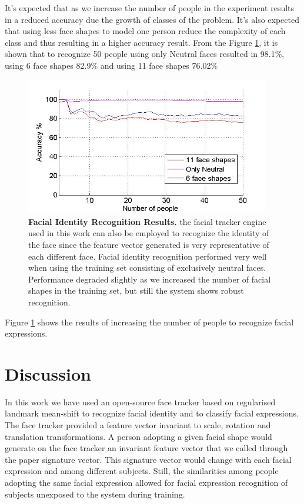 \documentclass[]{article}
\begin{document}
It's expected that as we increase the number of people in the experiment results
in a reduced accuracy due the growth of classes of the problem. It’s also
expected  that using less face shapes to model one person reduce the complexity
of  each class and thus resulting in a higher accuracy result.
From the Figure \ref{feRecognition}, it is shown that to recognize 50 people
using only Neutral faces resulted in 98.1\%, using 6 face shapes 82.9\% and
using 11 face shapes 76.02\%
 


\begin{figure}[ht]
\begin{center}
\vspace{-3mm}
\includegraphics[width=0.95\textwidth]{figures/peopleRecognition4.jpg}
\end{center}
\caption{\textbf{Facial Identity Recognition Results.} the facial tracker engine used in this work can also be employed 
to recognize the identity of the face since the feature vector generated is very representative  of each different face.
Facial identity recognition performed very well when using the training set consisting of exclusively neutral faces. 
Performance degraded slightly as we increased the number of facial shapes in the training set, but still the system shows 
robust  recognition.}
\label{feRecognition}
\end{figure}

Figure \ref{feRecognition} shows the results of increasing the number of people
to recognize facial expressions.


\section{Discussion}
In this work we have used an open-source face tracker based on regularised landmark mean-shift to recognize facial
identity and to classify facial expressions. The face tracker provided a feature vector invariant to scale, rotation and
translation transformations. A person adopting a given facial shape would generate on the face tracker an invariant
feature vector that we called through the paper signature vector. This signature vector would change with each facial
expression  and among different subjects. Still, the similarities among people adopting the same facial expression 
allowed for facial expression recognition of subjects unexposed to the system during training.
\end{document}

